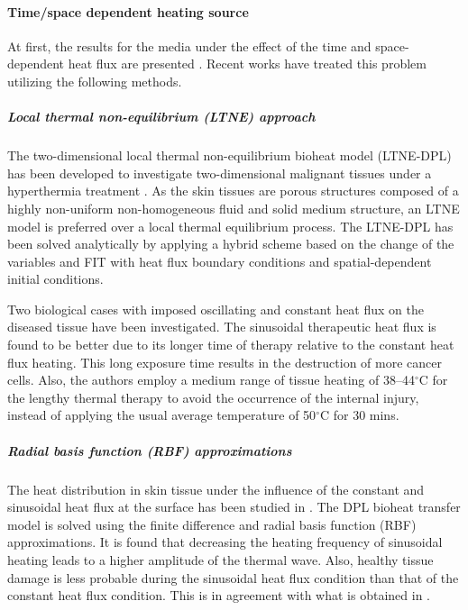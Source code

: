 \documentclass[sn-mathphys]{sn-jnl}%
\theoremstyle{thmstyleone}%
\theoremstyle{thmstyletwo}%
\theoremstyle{thmstylethree}%
\begin{document}
\paragraph{Time/space dependent heating source}
At first, the results for the media under the effect of the time and space-dependent heat flux are presented \cite{KNRai2020}. Recent works have treated this problem utilizing the following methods.
\subparagraph{Local thermal non-equilibrium (LTNE) approach}
The two-dimensional local thermal non-equilibrium bioheat model (LTNE-DPL) has been developed to investigate two-dimensional malignant tissues under a hyperthermia treatment \cite{Dutta2019}. As the skin tissues are porous structures composed of a highly non-uniform non-homogeneous fluid and solid medium structure, an LTNE model is preferred over a local thermal equilibrium process. The LTNE-DPL has been solved analytically by applying a hybrid scheme based on the change of the variables and FIT with heat flux boundary conditions and spatial-dependent initial conditions.

Two biological cases with imposed oscillating and constant heat flux on the diseased tissue have been investigated. The sinusoidal therapeutic heat flux is found to be better due to its longer time of therapy relative to the constant heat flux heating. This long exposure time results in the destruction of more cancer cells. Also, the authors employ a medium range of tissue heating of 38–44$^\circ$C for the lengthy thermal therapy to avoid the occurrence of the internal injury, instead of applying the usual average temperature of 50$^\circ$C for 30 mins.

\subparagraph{Radial basis function (RBF) approximations}
The heat distribution in skin tissue under the influence of the constant and sinusoidal heat flux at the surface has been studied in \cite{Verma2020}. The DPL bioheat transfer model is solved using the finite difference and radial basis function (RBF) approximations. It is found that decreasing the heating frequency of sinusoidal heating leads to a higher amplitude of the thermal wave. Also, healthy tissue damage is less probable during the sinusoidal heat flux condition than that of the constant heat flux condition. This is in agreement with what is obtained in \cite{Dutta2019}.
\end{document}
